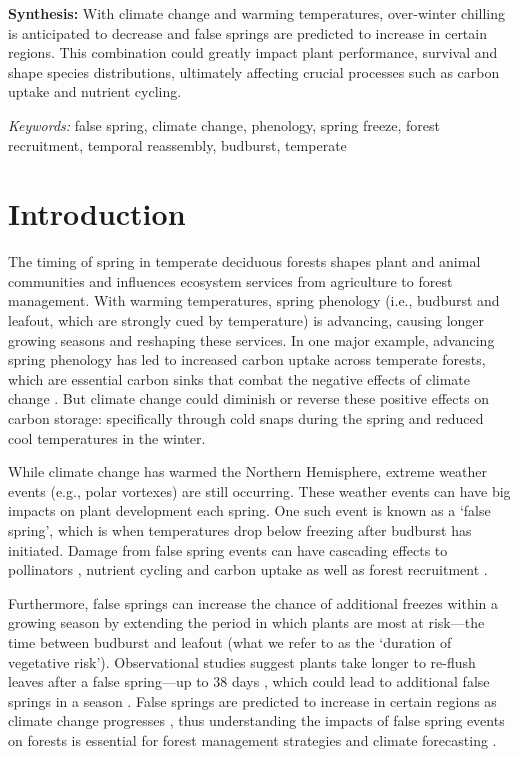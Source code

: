 \documentclass{article}\usepackage[]{graphicx}\usepackage[]{color}
\begin{document}
\textbf{Synthesis:} With climate change and warming temperatures, over-winter chilling is anticipated to decrease and false springs are predicted to increase in certain regions. This combination could greatly impact plant performance, survival and shape species distributions, ultimately affecting crucial processes such as carbon uptake and nutrient cycling.

\vspace{2ex}
\textit{Keywords:} false spring, climate change, phenology, spring freeze, forest recruitment, temporal reassembly, budburst, temperate

\section*{Introduction}
The timing of spring in temperate deciduous forests shapes plant and animal communities and influences ecosystem services from agriculture to forest management. With warming temperatures, spring phenology (i.e., budburst and leafout, which are strongly cued by temperature) is advancing, causing longer growing seasons \citep{Chuine2001} and reshaping these services. In one major example, advancing spring phenology has led to increased carbon uptake across temperate forests, which are essential carbon sinks that combat the negative effects of climate change \citep{Keenan2014}. But climate change could diminish or reverse these positive effects on carbon storage: specifically through cold snaps during the spring and reduced cool temperatures in the winter.
  
While climate change has warmed the Northern Hemisphere, extreme weather events (e.g., polar vortexes) are still occurring. These weather events can have big impacts on plant development each spring. One such event is known as a `false spring', which is when temperatures drop below freezing \citep[][i.e., below -2.2$^{\circ}$C]{Schwartz2002} after budburst has initiated. Damage from false spring events can have cascading effects to pollinators \citep{Boggs2012, Pardee2017}, nutrient cycling and carbon uptake as well as forest recruitment \citep{Hufkens2012, Klosterman2018, Richardson2013}.

Furthermore, false springs can increase the chance of additional freezes within a growing season by extending the period in which plants are most at risk---the time between budburst and leafout (what we refer to as the `duration of vegetative risk'). Observational studies suggest plants take longer to re-flush leaves after a false spring---up to 38 days \citep{Augspurger2009, Augspurger2013, Gu2008, Menzel2015}, which could lead to additional false springs in a season \citep{Augspurger2009}. False springs are predicted to increase in certain regions as climate change progresses \citep{Ault2015, Liu2018, Zohner2020}, thus understanding the impacts of false spring events on forests is essential for forest management strategies and climate forecasting \citep{OBrien2019}. 
  
\end{document}

